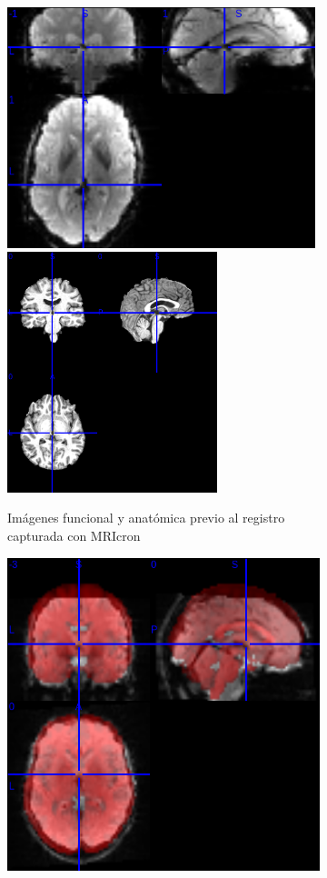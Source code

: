 \begin{figure}[H]
  \begin{subfigure}{\linewidth}
  \includegraphics[width=.5\linewidth , height=7cm]{img/preproc/mcf_out.png}\hfill
  \includegraphics[width=.5\linewidth , height=7cm]{img/preproc/mprage_brain.png}\hfill
  \caption{Imágenes funcional y anatómica previo al registro capturada con MRIcron}
  \end{subfigure}\par\medskip
  \begin{subfigure}{\linewidth}
  \includegraphics[width=.5\linewidth]{img/preproc/f1.png}\hfill

\end{subfigure}
\end{figure}
